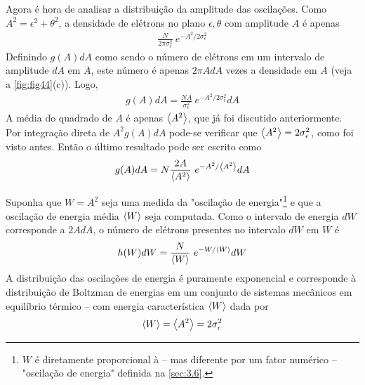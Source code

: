 Agora é hora de analisar a distribuição da amplitude das oscilações. Como $A^2 = \epsilon^2 + \theta^2$, a densidade de elétrons no plano $\epsilon, \theta$ com amplitude $A$ é apenas
\begin{align}
	\frac{N}{2\pi \sigma_\epsilon^2}\ e^{-A^2/2\sigma_\epsilon^2}
\end{align}
Definindo $g(A)dA$ como sendo o número de elétrons em um intervalo de amplitude $dA$ em $A$, este número é apenas $2\pi AdA$ vezes a densidade em $A$ (veja a \autoref{fig:fig44}(c)). Logo,
\begin{align}
	g(A)dA = \frac{N A}{\sigma_\epsilon^2}\ e^{-A^2/2\sigma_\epsilon^2}dA\label{eq:5.61}
\end{align}
A média do quadrado de $A$ é apenas $\left< A^2 \right>$, que já foi discutido anteriormente. Por integração direta de $A^2 g(A)dA$ pode-se verificar que $\left< A^2 \right> = 2\sigma_\epsilon^2$, como foi visto antes. Então o último resultado pode ser escrito como
\begin{align}
	g(A)dA = N\frac{2A}{\left< A^2 \right>}\ e^{-A^2/\left< A^2 \right>}dA
\end{align}

Suponha que $W=A^2$ seja uma medida da "oscilação de energia"\footnote{$W$ é diretamente proporcional à -- mas diferente por um fator numérico -- "oscilação de energia" definida na \autoref{sec:3.6}.} e que a oscilação de energia média $\left< W \right>$ seja computada. Como o intervalo de energia $dW$ corresponde a $2AdA$, o número de elétrons presentes no intervalo $dW$ em $W$ é
\begin{align}
	h(W)dW = \frac{N}{\left< W \right>}\ e^{-W/\left< W \right>}dW\label{eq:5.62}
\end{align}
A distribuição das oscilações de energia é puramente exponencial e corresponde à distribuição de Boltzman de energias em um conjunto de sistemas mecânicos em equilíbrio térmico -- com energia característica $\left< W \right>$ dada por
\begin{align}
	\left< W \right> = \left< A^2 \right> = 2\sigma_\epsilon^2
\end{align}